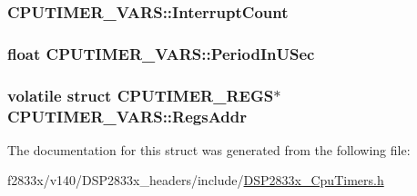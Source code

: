 \subsubsection[{Interrupt\+Count}]{ C\+P\+U\+T\+I\+M\+E\+R\+\_\+\+V\+A\+R\+S\+::\+Interrupt\+Count}\label{struct_c_p_u_t_i_m_e_r___v_a_r_s_a83ad083116197c6db8709e4a83c4965e}
\hypertarget{struct_c_p_u_t_i_m_e_r___v_a_r_s_abb588e9091af6b4e731f7425a0d641c6}{}
\subsubsection[{Period\+In\+U\+Sec}]{\setlength{\rightskip}{0pt plus 5cm}float C\+P\+U\+T\+I\+M\+E\+R\+\_\+\+V\+A\+R\+S\+::\+Period\+In\+U\+Sec}\label{struct_c_p_u_t_i_m_e_r___v_a_r_s_abb588e9091af6b4e731f7425a0d641c6}
\hypertarget{struct_c_p_u_t_i_m_e_r___v_a_r_s_a93c71efa618d7cf9ae8f95db0c5acd6c}{}
\subsubsection[{Regs\+Addr}]{\setlength{\rightskip}{0pt plus 5cm}volatile struct {\bf C\+P\+U\+T\+I\+M\+E\+R\+\_\+\+R\+E\+G\+S}$\ast$ C\+P\+U\+T\+I\+M\+E\+R\+\_\+\+V\+A\+R\+S\+::\+Regs\+Addr}\label{struct_c_p_u_t_i_m_e_r___v_a_r_s_a93c71efa618d7cf9ae8f95db0c5acd6c}


The documentation for this struct was generated from the following file\+:\begin{DoxyCompactItemize}
\item 
f2833x/v140/\+D\+S\+P2833x\+\_\+headers/include/\hyperlink{_d_s_p2833x___cpu_timers_8h}{D\+S\+P2833x\+\_\+\+Cpu\+Timers.\+h}\end{DoxyCompactItemize}
